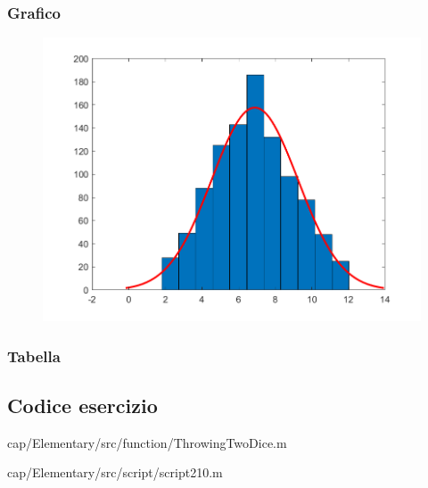 \subsubsection{Grafico}
\begin{figure}[h]
    \centering
    \includegraphics[width=0.7\linewidth]{cap/Elementary/img/script210}
    \label{fig:script210}
\end{figure}
\subsubsection{Tabella}

\pagebreak

\subsection{Codice esercizio}

{cap/Elementary/src/function/ThrowingTwoDice.m}

%

%


{cap/Elementary/src/script/script210.m}
